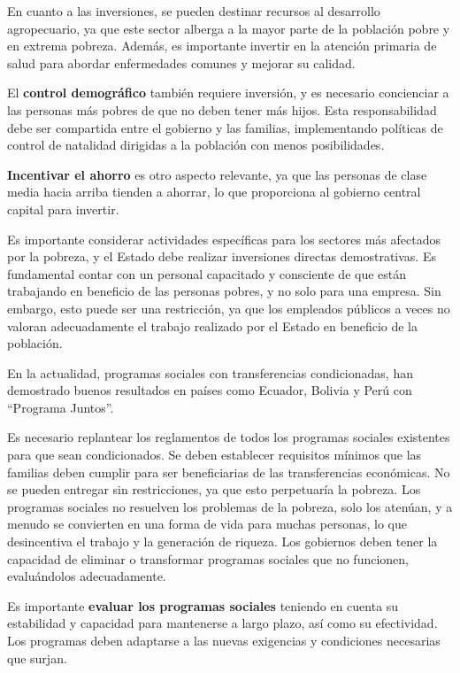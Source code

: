 \documentclass[
  a4paper,
]{article}
\begin{document}
En cuanto a las inversiones, se pueden destinar recursos al desarrollo
agropecuario, ya que este sector alberga a la mayor parte de la
población pobre y en extrema pobreza. Además, es importante invertir en
la atención primaria de salud para abordar enfermedades comunes y
mejorar su calidad.

El \textbf{control demográfico} también requiere inversión, y es
necesario concienciar a las personas más pobres de que no deben tener
más hijos. Esta responsabilidad debe ser compartida entre el gobierno y
las familias, implementando políticas de control de natalidad dirigidas
a la población con menos posibilidades.

\textbf{Incentivar el ahorro} es otro aspecto relevante, ya que las
personas de clase media hacia arriba tienden a ahorrar, lo que
proporciona al gobierno central capital para invertir.

Es importante considerar actividades específicas para los sectores más
afectados por la pobreza, y el Estado debe realizar inversiones directas
demostrativas. Es fundamental contar con un personal capacitado y
consciente de que están trabajando en beneficio de las personas pobres,
y no solo para una empresa. Sin embargo, esto puede ser una restricción,
ya que los empleados públicos a veces no valoran adecuadamente el
trabajo realizado por el Estado en beneficio de la población.

En la actualidad, programas sociales con transferencias condicionadas,
han demostrado buenos resultados en países como Ecuador, Bolivia y Perú
con ``Programa Juntos''.

Es necesario replantear los reglamentos de todos los programas sociales
existentes para que sean condicionados. Se deben establecer requisitos
mínimos que las familias deben cumplir para ser beneficiarias de las
transferencias económicas. No se pueden entregar sin restricciones, ya
que esto perpetuaría la pobreza. Los programas sociales no resuelven los
problemas de la pobreza, solo los atenúan, y a menudo se convierten en
una forma de vida para muchas personas, lo que desincentiva el trabajo y
la generación de riqueza. Los gobiernos deben tener la capacidad de
eliminar o transformar programas sociales que no funcionen, evaluándolos
adecuadamente.

Es importante \textbf{evaluar los programas sociales} teniendo en cuenta
su estabilidad y capacidad para mantenerse a largo plazo, así como su
efectividad. Los programas deben adaptarse a las nuevas exigencias y
condiciones necesarias que surjan.
\end{document}

